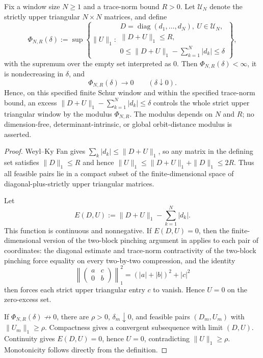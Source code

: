 \begin{lemma}
  \label{lem:finite-schur-window-compactness-modulus}
  Fix a window size \(N\ge1\) and a trace-norm bound \(R>0\).  Let
  \(\mathcal U_N\) denote the strictly upper triangular \(N\times N\)
  matrices, and define
  \[
    \Phi_{N,R}(\delta)
    :=
    \sup\left\{
      \|U\|_1:
      \begin{array}{l}
        D=\operatorname{diag}(d_1,\ldots,d_N),\ U\in\mathcal U_N,\\[2pt]
        \|D+U\|_1\le R,\\[2pt]
        0\le \|D+U\|_1-
        \sum_{k=1}^N |d_k|\le\delta
      \end{array}
    \right\},
  \]
  with the supremum over the empty set interpreted as \(0\).  Then
  \(\Phi_{N,R}(\delta)<\infty\), it is nondecreasing in \(\delta\), and
  \[
    \Phi_{N,R}(\delta)\longrightarrow0
    \qquad(\delta\downarrow0).
  \]
  Hence, on this specified finite Schur window and within the specified
  trace-norm bound, an excess
  \(\|D+U\|_1-
  \sum_{k=1}^N|d_k|\le\delta\) controls the whole strict upper triangular
  window by the modulus \(\Phi_{N,R}\).  The modulus depends on \(N\) and
  \(R\); no dimension-free, determinant-intrinsic, or global orbit-distance
  modulus is asserted.
\end{lemma}

\begin{proof}
  Weyl--Ky Fan gives
  \(\sum_k|d_k|\le\|D+U\|_1\), so any matrix in the defining set satisfies
  \(\|D\|_1\le R\) and hence
  \(\|U\|_1\le\|D+U\|_1+
  \|D\|_1\le2R\).  Thus all feasible pairs lie in a compact subset of the
  finite-dimensional space of diagonal-plus-strictly upper triangular
  matrices.

  Let
  \[
    E(D,U):=\|D+U\|_1-
      \sum_{k=1}^N |d_k| .
  \]
  This function is continuous and nonnegative.  If \(E(D,U)=0\), then the
  finite-dimensional version of the two-block pinching argument in
   applies to each pair of
  coordinates: the diagonal estimate and trace-norm contractivity of the
  two-block pinching force equality on every two-by-two compression, and the
  identity
  \[
    \left\|\begin{pmatrix}a&c\\0&b\end{pmatrix}\right\|_1^2
    =(|a|+|b|)^2+|c|^2
  \]
  then forces each strict upper triangular entry \(c\) to vanish.  Hence
  \(U=0\) on the zero-excess set.

  If \(\Phi_{N,R}(\delta)\not\to0\), there are
  \(\rho>0\), \(\delta_m\downarrow0\), and feasible pairs \((D_m,U_m)\) with
  \(\|U_m\|_1\ge\rho\).  Compactness gives a convergent subsequence with limit
  \((D,U)\).  Continuity gives \(E(D,U)=0\), hence \(U=0\), contradicting
  \(\|U\|_1\ge\rho\).  Monotonicity follows directly from the definition.
\end{proof}

